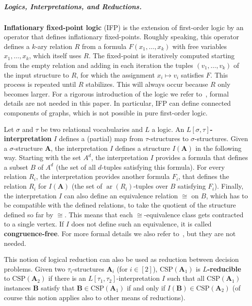 \documentclass[a4paper,english, thm-restate]{lipics-v2021}
\newcommand{\defining}[1]{\textbf{#1}}
\newcommand{\sig}{\tau}
\newcommand{\arity}[1]{\operatorname*{ar}(#1)}
\newcommand{\StructA}{\mathbf{A}}
\newcommand{\StructB}{\mathbf{B}}
\newcommand{\CSP}[1]{\mathrm{CSP}(#1)}
\begin{document}
	
	
	
	
	
	
	
	
	
	
	\subparagraph{Logics, Interpretations, and Reductions.}
	\defining{Inflationary fixed-point logic} (IFP) is the extension of first-order logic
	by an operator that defines inflationary fixed-points.
	Roughly speaking, this operator defines a $k$-ary relation $R$ from a formula $F(x_1,\dots, x_k)$ with free variables $x_1,\dots,x_k$,
	which itself uses $R$.
	The fixed-point is iteratively computed starting from the empty relation
	and adding in each iteration the tuples $(v_1,\dots,v_k)$ of the input structure to $R$, for which the assignment $x_i \mapsto v_i$ satisfies $F$.
	This process is repeated until $R$ stabilizes.
	This will always occur because $R$ only becomes larger.
	For a rigorous introduction of the logic we refer to~\cite{EbbinghausFlum1995},
	formal details are not needed in this paper.
	In particular, IFP can define connected components of graphs, which is not possible in pure first-order logic.
	
	Let $\sigma$ and $\tau$ be two relational vocabularies and $L$ a logic.
	An \defining{$L[\sigma,\tau]$-interpretation} $I$ defines a (partial) map from $\tau$-structures to $\sigma$-structures.
	Given a $\sigma$-structure $\StructA$, the interpretation $I$
	defines a structure $I(\StructA)$ in the following way.
	Starting with the set $A^d$, the interpretation $I$ provides a formula
	that defines a subset $B$ of $A^d$ (the set of all $d$-tuples satisfying this formula).
	For every relation $R_i$, the interpretation provides another formula $F_i$,
	that defines the relation $R_i$ for $I(\StructA)$ (the set of $\arity{R_i}$-tuples over $B$ satisfying $F_i$).
	Finally, the interpretation $I$ can also define an equivalence relation $\cong$ on $B$,
	which has to be compatible with the defined relations,
	to take the quotient of the structure defined so far by $\cong$.
	This means that each $\cong$-equivalence class gets contracted to a single vertex.
	If $I$ does not define such an equivalence, it is called \defining{congruence-free}.
	For more formal details we also refer to~\cite{EbbinghausFlum1995}, but they are not needed.
	
	This notion of logical reduction can also be used as reduction between decision problems.
	Given two $\sig_i$-structures $\StructA_i$ (for $i \in [2]$),
	$\CSP{\StructA_1}$ is \defining{$L$-reducible} to $\CSP{\StructA_2}$
	if there is an $L[\sig_1,\sig_2]$-interpretation $I$
	such that all $\CSP{\StructA_1}$ instances $\StructB$ satisfy
	that $\StructB \in \CSP{\StructA_1}$ if and only if $I(\StructB) \in \CSP{\StructA_2}$ (of course this notion applies also to other means of reductions).
	
\end{document}
